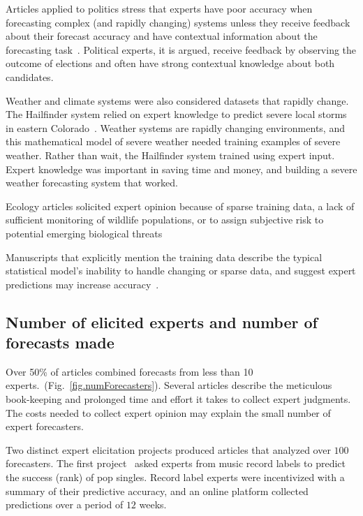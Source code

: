 \documentclass[preprint,authoryear]{elsarticle}
\begin{document}
Articles applied to politics stress that experts have poor accuracy when forecasting complex (and rapidly changing) systems unless they receive feedback about their forecast accuracy and have contextual information about the forecasting task~\citep{graefe2014accuracy,graefe2015accuracy,graefe2018predicting,satopaa2014probability}.
Political experts, it is argued, receive feedback by observing the outcome of elections and often have strong contextual knowledge about both candidates.  

Weather and climate systems were also considered datasets that rapidly change.
The Hailfinder system relied on expert knowledge to predict severe local storms in eastern Colorado~\citep{abramson1996hailfinder}.
Weather systems are rapidly changing environments, and this mathematical model of severe weather needed training examples of severe weather.
Rather than wait, the Hailfinder system trained using expert input.
Expert knowledge was important in saving time and money, and building a severe weather forecasting system that worked.

Ecology articles solicited expert opinion because of sparse training data, a lack of sufficient monitoring of wildlife populations, or to assign subjective risk to potential emerging biological threats~\citep{li2012preliminary,mantyka2014understanding,kurowicka2010probabilistic}

Manuscripts that explicitly mention the training data describe the typical statistical model's inability to handle changing or sparse data, and suggest expert predictions may increase accuracy~\citep{seifert2013relative,song2013combining}.

\subsection{Number of elicited experts and number of forecasts made}

Over 50\% of articles combined forecasts from less than 10 experts.~(Fig.~\ref{fig.numForecasters}).
Several articles describe the meticulous book-keeping and prolonged time and effort it takes to collect expert judgments.
The costs needed to collect expert opinion may explain the small number of expert forecasters.

Two distinct expert elicitation projects produced articles that analyzed over $100$ forecasters.
The first project~\citep{seifert2013relative} asked experts from music record labels to predict the success (rank) of pop singles.
Record label experts were incentivized with a summary of their predictive accuracy, and 
an online platform collected predictions over a period of $12$ weeks.
\end{document}
